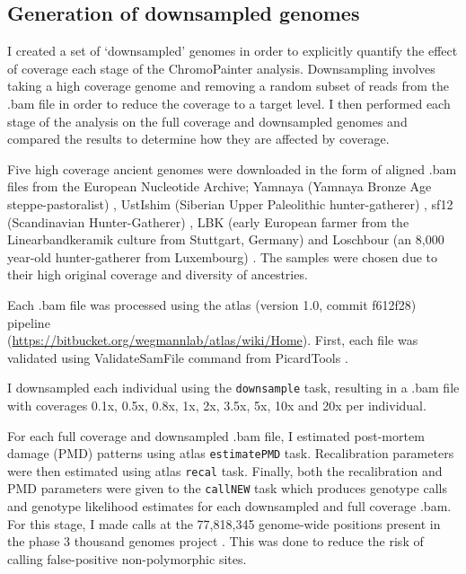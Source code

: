\subsection{Generation of downsampled genomes}

I created a set of `downsampled' genomes in order to explicitly quantify the effect of coverage each stage of the ChromoPainter analysis. Downsampling involves taking a high coverage genome and removing a random subset of reads from the .bam file in order to reduce the coverage to a target level. I then performed each stage of the analysis on the full coverage and downsampled genomes and compared the results to determine how they are affected by coverage.

Five high coverage ancient genomes were downloaded in the form of aligned .bam files from the European Nucleotide Archive; Yamnaya (Yamnaya Bronze Age steppe-pastoralist) \cite{deBarrosDamgaardeaar7711}, UstIshim (Siberian Upper Paleolithic hunter-gatherer) \cite{Fu2014}, sf12 (Scandinavian Hunter-Gatherer) \cite{Gunther2018a}, LBK (early European farmer from the Linearbandkeramik culture from Stuttgart, Germany) \cite{Lazaridis2014} and Loschbour (an 8,000 year-old hunter-gatherer from Luxembourg) \cite{Lazaridis2014}. The samples were chosen due to their high original coverage and diversity of ancestries. 

Each .bam file was processed using the atlas (version 1.0, commit f612f28) pipeline \cite{Link2017} \\(\url{https://bitbucket.org/wegmannlab/atlas/wiki/Home}). First, each file was validated using ValidateSamFile command from PicardTools \cite{Picard2018toolkit}. 

I downsampled each individual using the \texttt{downsample} task, resulting in a .bam file with coverages 0.1x, 0.5x, 0.8x, 1x, 2x, 3.5x, 5x, 10x and 20x per individual. 

For each full coverage and downsampled .bam file, I estimated post-mortem damage (PMD) patterns using atlas \texttt{estimatePMD} task. Recalibration parameters were then estimated using atlas \texttt{recal} task. Finally, both the recalibration and PMD parameters were given to the \texttt{callNEW} task which produces genotype calls and genotype likelihood estimates for each downsampled and full coverage .bam. For this stage, I made calls at the 77,818,345 genome-wide positions present in the phase 3 thousand genomes project \cite{1000GenomesProjectConsortium2015}. This was done to reduce the risk of calling false-positive non-polymorphic sites.

